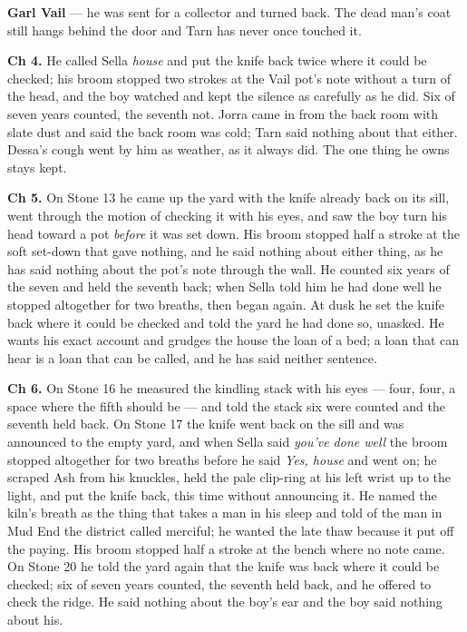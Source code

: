 \documentclass{design/chronicle}
\begin{document}
{\textbf{Garl Vail} — he was sent for a collector and turned back. The dead man’s coat still hangs behind the door and Tarn has never once touched it.

\textbf{Ch 4.} He called Sella \emph{house} and put the knife back twice where it could be checked; his broom stopped two strokes at the Vail pot’s note without a turn of the head, and the boy watched and kept the silence as carefully as he did. Six of seven years counted, the seventh not. Jorra came in from the back room with slate dust and said the back room was cold; Tarn said nothing about that either. Dessa’s cough went by him as weather, as it always did. The one thing he owns stays kept.

\textbf{Ch 5.} On Stone 13 he came up the yard with the knife already back on its sill, went through the motion of checking it with his eyes, and saw the boy turn his head toward a pot \emph{before} it was set down. His broom stopped half a stroke at the soft set-down that gave nothing, and he said nothing about either thing, as he has said nothing about the pot’s note through the wall. He counted six years of the seven and held the seventh back; when Sella told him he had done well he stopped altogether for two breaths, then began again. At dusk he set the knife back where it could be checked and told the yard he had done so, unasked. He wants his exact account and grudges the house the loan of a bed; a loan that can hear is a loan that can be called, and he has said neither sentence.

\textbf{Ch 6.} On Stone 16 he measured the kindling stack with his eyes --- four, four, a space where the fifth should be --- and told the stack six were counted and the seventh held back. On Stone 17 the knife went back on the sill and was announced to the empty yard, and when Sella said \emph{you’ve done well} the broom stopped altogether for two breaths before he said \emph{Yes, house} and went on; he scraped Ash from his knuckles, held the pale clip-ring at his left wrist up to the light, and put the knife back, this time without announcing it. He named the kiln’s breath as the thing that takes a man in his sleep and told of the man in Mud End the district called merciful; he wanted the late thaw because it put off the paying. His broom stopped half a stroke at the bench where no note came. On Stone 20 he told the yard again that the knife was back where it could be checked; six of seven years counted, the seventh held back, and he offered to check the ridge. He said nothing about the boy’s ear and the boy said nothing about his.

}
\end{document}
